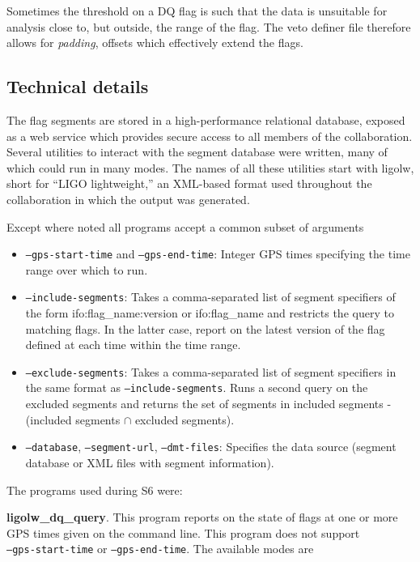 Sometimes the threshold on a DQ flag is such that the data is
unsuitable for analysis close to, but outside, the range of the flag.
The veto definer file therefore allows for \emph{padding}, offsets 
which effectively extend the flags.


\subsection{Technical details}

The flag segments are stored in a high-performance relational
database, exposed as a web service which provides secure access to all
members of the collaboration.  Several utilities to interact with the
segment database were written, many of which could run in many modes.
The names of all these utilities start with ligolw, short for ``LIGO
lightweight,'' an XML-based format used throughout the collaboration
in which the output was generated.

Except where noted all programs accept a common subset of arguments
\begin{itemize}
\item \texttt{--gps-start-time} and \texttt{--gps-end-time}: Integer
GPS times specifying the time range over which to run.
\item \texttt{--include-segments}: Takes a comma-separated list of
segment specifiers of the form ifo:flag\_name:version or
ifo:flag\_name and restricts the query to matching flags.  In the
latter case, report on the latest version of the flag defined at each
time within the time range.
\item \texttt{--exclude-segments}: Takes a comma-separated list of
segment specifiers in the same format as \texttt{--include-segments}.
Runs a second query on the excluded segments and returns the set of
segments in included segments - (included segments $\cap$ excluded
segments).
\item \texttt{--database}, \texttt{--segment-url},
\texttt{--dmt-files}: Specifies the data source (segment database or
XML files with segment information).
\end{itemize}


The programs used during S6 were:

\textbf{ligolw\_dq\_query}.  This program reports on the state of
flags at one or more GPS times given on the command line.  This
program does not support \\
\texttt{--gps-start-time} or \texttt{--gps-end-time}.   The available modes are

